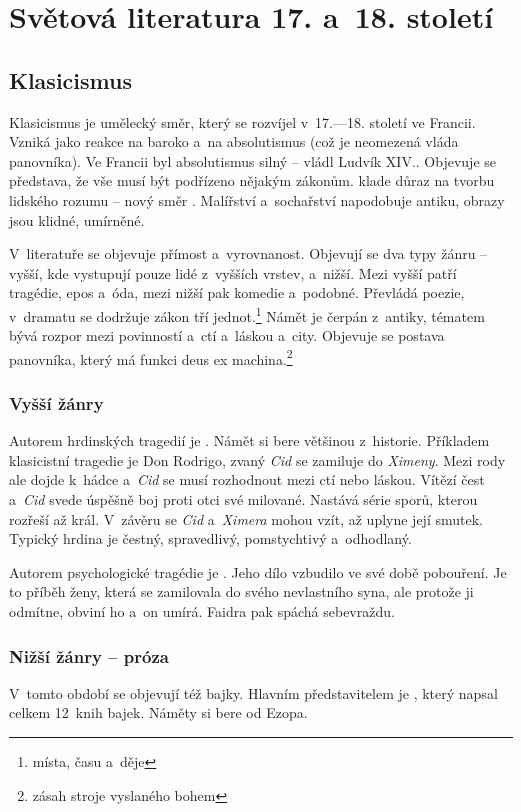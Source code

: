 \chapter{Světová literatura 17. a~18. století}

\section{Klasicismus}
Klasicismus je umělecký směr, který se rozvíjel v~17.---18. století
ve Francii. Vzniká jako reakce na baroko a~na absolutismus (což 
je neomezená vláda panovníka). Ve Francii byl absolutismus silný -- vládl
Ludvík XIV.. Objevuje se představa, že vše musí být podřízeno nějakým
zákonům.  klade důraz na tvorbu lidského rozumu -- nový
směr . Malířství a~sochařství napodobuje antiku,
obrazy jsou klidné, umírněné.

V~literatuře se objevuje přímost a~vyrovnanost. Objevují se dva typy 
žánru -- vyšší, kde vystupují pouze lidé z~vyšších vrstev, a~nižší. Mezi
vyšší patří tragédie, epos a~óda, mezi nižší pak komedie a~podobné.
Převládá poezie, v~dramatu se dodržuje zákon tří jednot.\footnote{místa,
času a~děje} Námět je čerpán z~antiky, tématem bývá rozpor mezi povinností
a~ctí a~láskou a~city. Objevuje se postava panovníka, který má funkci
deus ex machina.\footnote{zásah stroje vyslaného bohem}

\subsection*{Vyšší žánry}
Autorem hrdinských tragedií je . Námět si bere většinou
z~historie. Příkladem klasicistní tragedie je  Don Rodrigo,
zvaný \emph{Cid} se zamiluje do \emph{Ximeny}. Mezi rody ale dojde k~hádce
a~\emph{Cid} se musí rozhodnout mezi ctí nebo láskou. Vítězí čest 
a~\emph{Cid} svede úspěšně boj proti otci své milované. Nastává
série sporů, kterou rozřeší až král. V~závěru se \emph{Cid} a~\emph{Ximera}
mohou vzít, až uplyne její smutek. Typický hrdina je čestný, spravedlivý,
pomstychtivý a~odhodlaný.

Autorem psychologické tragédie je . Jeho dílo 
vzbudilo ve své době pobouření. Je to příběh ženy, která se zamilovala 
do svého nevlastního syna, ale protože ji odmítne, obviní ho a~on umírá.
Faidra pak spáchá sebevraždu.

\subsection*{Nižší žánry -- próza}
V~tomto období se objevují též bajky. Hlavním představitelem je
, který napsal celkem 12~knih bajek.
Náměty si bere od Ezopa.

